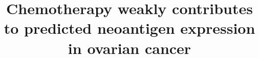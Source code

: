 \documentclass[linenumbers]{bmcart}
\begin{document}
\begin{frontmatter}

\begin{fmbox}


\title{Chemotherapy weakly contributes to predicted neoantigen expression in ovarian cancer}


\author[addressref={aff1}, email={tim@hammerlab.org}]{ }
\author[addressref={aff2}, email={elizabeth.christie@petermac.org}]{ }
\author[addressref={aff1}, email={aahuja11@gmail.com}]{ }
\author[addressref={aff1}, email={jacki@hammerlab.org}]{ }
\author[addressref={aff1}, email={arman@hammerlab.org}]{ }
\author[addressref={aff2}, email={david.bowtell@petermac.org}]{ }
\author[addressref={aff3}, noteref={n1}, email={snyderca@mskcc.org}]{ }
\author[addressref={aff1}, noteref={n1}, email={hammer@hammerlab.org}]{ }




\end{fmbox}
\end{frontmatter}
\end{document}
